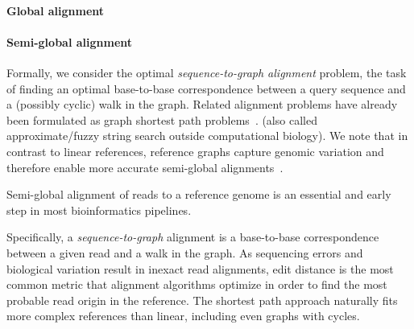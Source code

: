 \paragraph{Global alignment}

\paragraph{Semi-global alignment}
Formally, we consider the optimal \emph{sequence-to-graph alignment} problem,
the task of finding an optimal base-to-base correspondence between a query
sequence and a (possibly cyclic) walk in the graph. Related alignment problems
have already been formulated as graph shortest path
problems~\cite{jain_complexity_2019}.
 (also called approximate/fuzzy string search outside computational
biology).
We note that in contrast to linear references, reference graphs capture genomic
variation and therefore enable more accurate semi-global
alignments~\citep{garrison_variation_2018}.

Semi-global alignment of reads to a reference genome is an essential and early
step in most bioinformatics pipelines.

Specifically, a \emph{sequence-to-graph} alignment is a base-to-base
correspondence between a given read and a walk in the graph. As sequencing
errors and biological variation result in inexact read alignments, edit distance
is the most common metric that alignment algorithms optimize in order to find
the most probable read origin in the reference. The shortest path approach
naturally fits more complex references than linear, including even graphs with
cycles.
